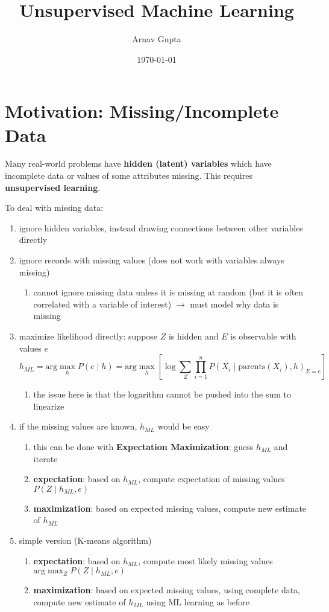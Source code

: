 \documentclass[11pt]{article}
\author{Arnav Gupta}
\date{\today}
\title{Unsupervised Machine Learning}
\begin{document}
\maketitle
\tableofcontents

\section{Motivation: Missing/Incomplete Data}
\label{sec:org19f9f7a}
Many real-world problems have \textbf{hidden (latent) variables} which have incomplete data
or values of some attributes missing.
This requires \textbf{unsupervised learning}.

To deal with missing data:
\begin{enumerate}
\item ignore hidden variables, instead drawing connections between other variables directly
\item ignore records with missing values (does not work with variables always missing)
\begin{enumerate}
\item cannot ignore missing data unless it is missing at random (but it is often correlated
with a variable of interest) \(\to\) must model why data is missing
\end{enumerate}
\item maximize likelihood directly: suppose \(Z\) is hidden and \(E\) is observable with values \(e\)
$$ h_{ML} = \text{arg} \max_{h} P(e \mid h) = \text{arg} \max_{h} \left[ \log \sum_{Z} \prod_{i=1}^{n} P(X_{i} \mid \text{parents}(X_{i}), h)_{E = e} \right] $$
\begin{enumerate}
\item the issue here is that the logarithm cannot be pushed into the sum to linearize
\end{enumerate}
\item if the missing values are known, \(h_{ML}\) would be easy
\begin{enumerate}
\item this can be done with \textbf{Expectation Maximization}: guess \(h_{ML}\) and iterate
\item \textbf{expectation}: based on \(h_{ML}\), compute expectation of missing values \(P(Z \mid h_{ML}, e)\)
\item \textbf{maximization}: based on expected missing values, compute new estimate of \(h_{ML}\)
\end{enumerate}
\item simple version (K-means algorithm)
\begin{enumerate}
\item \textbf{expectation}: based on \(h_{ML}\), compute most likely missing values
\(\text{arg} \max_{Z} P(Z \mid h_{ML}, e)\)
\item \textbf{maximization}: based on expected missing values, using complete data, compute new
estimate of \(h_{ML}\) using ML learning as before
\end{enumerate}
\end{enumerate}
\end{document}
